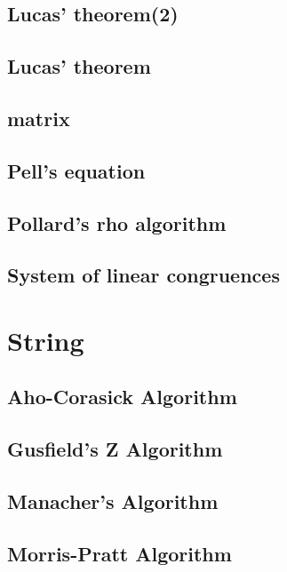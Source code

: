 \documentclass[a4paper,5pt,twocolumn,titlepage]{article}
\begin{document}
\subsection{Lucas' theorem(2)}

\subsection{Lucas' theorem}

\subsection{matrix}

\subsection{Pell's equation}

\subsection{Pollard's rho algorithm}

\subsection{System of linear congruences}



\section{String}
\subsection{Aho-Corasick Algorithm}

\subsection{Gusfield's Z Algorithm}

\subsection{Manacher's Algorithm}

\subsection{Morris-Pratt Algorithm}

\end{document}
